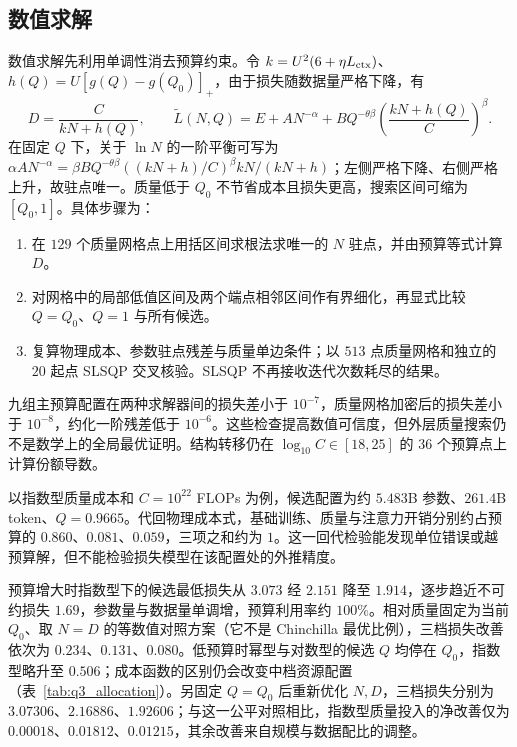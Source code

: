 

\subsection{数值求解}
数值求解先利用单调性消去预算约束。令 $k=U^2(6+\eta L_{\mathrm{ctx}})$、$h(Q)=U[g(Q)-g(Q_0)]_+$，由于损失随数据量严格下降，有
\begin{equation}
D=\frac{C}{kN+h(Q)},\qquad
\widetilde L(N,Q)=E+AN^{-\alpha}+BQ^{-\theta\beta}\left(\frac{kN+h(Q)}{C}\right)^\beta.
\label{eq:q3-profile}
\end{equation}
在固定 $Q$ 下，关于 $\ln N$ 的一阶平衡可写为 $\alpha AN^{-\alpha}=\beta BQ^{-\theta\beta}((kN+h)/C)^\beta kN/(kN+h)$；左侧严格下降、右侧严格上升，故驻点唯一。质量低于 $Q_0$ 不节省成本且损失更高，搜索区间可缩为 $[Q_0,1]$。具体步骤为：
\begin{enumerate}[leftmargin=2em,itemsep=0pt,topsep=0.2em]
  \item 在 $129$ 个质量网格点上用括区间求根法求唯一的 $N$ 驻点，并由预算等式计算 $D$。
  \item 对网格中的局部低值区间及两个端点相邻区间作有界细化，再显式比较 $Q=Q_0$、$Q=1$ 与所有候选。
  \item 复算物理成本、参数驻点残差与质量单边条件；以 $513$ 点质量网格和独立的 $20$ 起点 SLSQP 交叉核验。SLSQP 不再接收迭代次数耗尽的结果。
\end{enumerate}
九组主预算配置在两种求解器间的损失差小于 $10^{-7}$，质量网格加密后的损失差小于 $10^{-8}$，约化一阶残差低于 $10^{-6}$。这些检查提高数值可信度，但外层质量搜索仍不是数学上的全局最优证明。结构转移仍在 $\log_{10}C\in[18,25]$ 的 $36$ 个预算点上计算份额导数。

以指数型质量成本和 $C=10^{22}$ FLOPs 为例，候选配置为约 $5.483$B 参数、$261.4$B token、$Q=0.9665$。代回物理成本式，基础训练、质量与注意力开销分别约占预算的 $0.860$、$0.081$、$0.059$，三项之和约为 $1$。这一回代检验能发现单位错误或越预算解，但不能检验损失模型在该配置处的外推精度。



预算增大时指数型下的候选最低损失从 $3.073$ 经 $2.151$ 降至 $1.914$，逐步趋近不可约损失 $1.69$，参数量与数据量单调增，预算利用率约 $100\%$。相对质量固定为当前 $Q_0$、取 $N=D$ 的等数值对照方案（它不是 Chinchilla 最优比例），三档损失改善依次为 $0.234$、$0.131$、$0.080$。低预算时幂型与对数型的候选 $Q$ 均停在 $Q_0$，指数型略升至 $0.506$；成本函数的区别仍会改变中档资源配置（表~\ref{tab:q3_allocation}）。另固定 $Q=Q_0$ 后重新优化 $N,D$，三档损失分别为 $3.07306$、$2.16886$、$1.92606$；与这一公平对照相比，指数型质量投入的净改善仅为 $0.00018$、$0.01812$、$0.01215$，其余改善来自规模与数据配比的调整。

